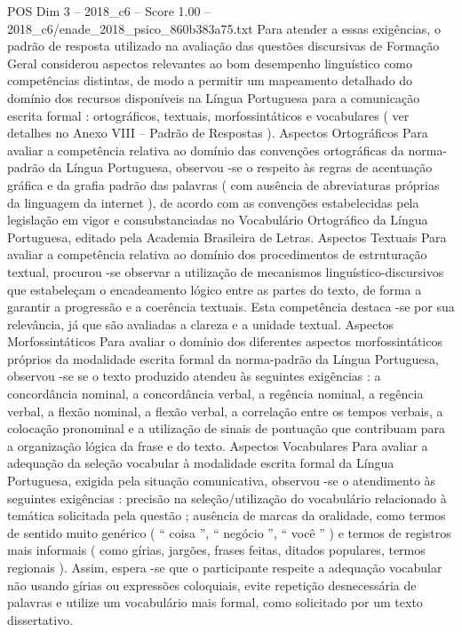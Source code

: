 \begin{textsample}{POS Dim 3 – 2018\_c6 – Score 1.00 – 2018\_c6/enade\_2018\_psico\_860b383a75.txt}
Para atender a essas exigências, o padrão de resposta utilizado na avaliação das questões discursivas de Formação Geral considerou aspectos relevantes ao bom desempenho linguístico como competências distintas, de modo a permitir um mapeamento detalhado do domínio dos recursos disponíveis na Língua Portuguesa para a comunicação escrita formal : ortográficos, textuais, morfossintáticos e vocabulares ( ver detalhes no Anexo VIII – Padrão de Respostas ).
Aspectos Ortográficos Para avaliar a competência relativa ao domínio das convenções ortográficas da norma-padrão da Língua Portuguesa, observou -se o respeito às regras de acentuação gráfica e da grafia padrão das palavras ( com ausência de abreviaturas próprias da linguagem da internet ), de acordo com as convenções estabelecidas pela legislação em vigor e consubstanciadas no Vocabulário Ortográfico da Língua Portuguesa, editado pela Academia Brasileira de Letras.
Aspectos Textuais Para avaliar a competência relativa ao domínio dos procedimentos de estruturação textual, procurou -se observar a utilização de mecanismos linguístico-discursivos que estabeleçam o encadeamento lógico entre as partes do texto, de forma a garantir a progressão e a coerência textuais.
Esta competência destaca -se por sua relevância, já que são avaliadas a clareza e a unidade textual.
Aspectos Morfossintáticos Para avaliar o domínio dos diferentes aspectos morfossintáticos próprios da modalidade escrita formal da norma-padrão da Língua Portuguesa, observou -se se o texto produzido atendeu às seguintes exigências : a concordância nominal, a concordância verbal, a regência nominal, a regência verbal, a flexão nominal, a flexão verbal, a correlação entre os tempos verbais, a colocação pronominal e a utilização de sinais de pontuação que contribuam para a organização lógica da frase e do texto.
Aspectos Vocabulares Para avaliar a adequação da seleção vocabular à modalidade escrita formal da Língua Portuguesa, exigida pela situação comunicativa, observou -se o atendimento às seguintes exigências : precisão na seleção/utilização do vocabulário relacionado à temática solicitada pela questão ; ausência de marcas da oralidade, como termos de sentido muito genérico ( “ coisa ”, “ negócio ”, “ você ” ) e termos de registros mais informais ( como gírias, jargões, frases feitas, ditados populares, termos regionais ).
Assim, espera -se que o participante respeite a adequação vocabular não usando gírias ou expressões coloquiais, evite repetição desnecessária de palavras e utilize um vocabulário mais formal, como solicitado por um texto dissertativo.

\end{textsample}
